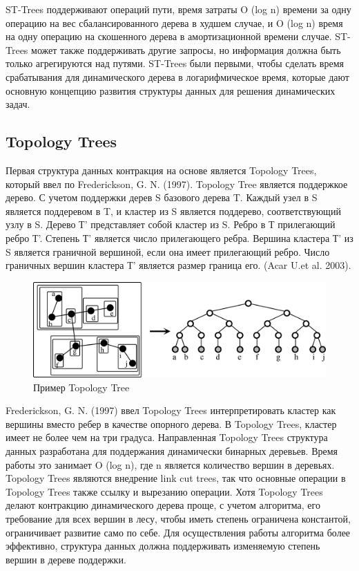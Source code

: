 \documentclass[specification,annotation]{itmo-student-thesis}
\newcommand{\revise}[1]{{\color{red!70!black} #1 }}
\begin{document}
\revise{
ST-Trees поддерживают операций пути, время затраты O (log n) времени за одну операцию на вес сбалансированного дерева в худшем случае, и O (log n) время на одну операцию на скошенного дерева в 
амортизационной времени случае. ST-Trees может также поддерживать другие запросы, но информация должна быть только агрегируются над путями. 
ST-Trees были первыми, чтобы сделать время срабатывания для динамического дерева в логарифмическое время, которые дают основную концепцию развития структуры данных для решения динамических задач.
}

\subsection{Topology Trees}

\revise{
Первая структура данных контракция на основе является Topology Trees, который ввел по Frederickson, G. N. (1997). Topology Tree является поддержкое дерево.
С учетом поддержки дерев S базового дерева T. Каждый узел в S является поддеревом в T, и кластер из S является поддерево, соответствующий узлу в S. Дерево Т' представляет собой кластер из S. Ребро в Т 
прилегающий ребро Т'. Степень Т' является число прилегающего ребра. Вершина кластера Т' из S является граничной вершиной, если она имеет прилегающий ребро. Число граничных вершин кластера Т' является 
размер граница его. (Acar U.et al. 2003).
}

\begin{figure}[!ht]
\centering
\includegraphics[width=\textwidth]{pic/topology-tree.png}
\caption{Пример Topology Tree}\label{fig:topology-tree}
\end{figure}

\revise{
Frederickson, G. N. (1997) ввел Topology Trees интерпретировать кластер как вершины вместо ребер в качестве опорного дерева. В Topology Trees, кластер имеет не более чем на три градуса. Направленная 
Topology Trees структура данных разработана для поддержания динамически бинарных деревьев. Время работы это занимает O (log n), где n является количество вершин в деревьях. Topology Trees являются 
внедрение link cut trees, так что основные операции в Topology Trees также ссылку и вырезанию операции. 
Хотя Topology Trees делают контракцию динамического дерева проще, с учетом алгоритма, его требование для всех вершин в лесу, чтобы иметь степень ограничена константой, ограничивает развитие само по себе. 
Для осуществления работы алгоритма более эффективно, структура данных должна поддерживать изменяемую степень вершин в дереве поддержки.
}
\end{document}
